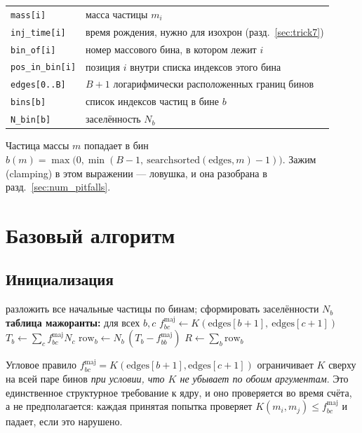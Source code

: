 \documentclass[a4paper,12pt]{article}
\newcommand{\fmaj}{f^{\mathrm{maj}}}
\newcommand{\code}[1]{\texttt{#1}}
\begin{document}
\begin{center}
\small
\begin{tabular}{@{}ll@{}}
\toprule
\code{mass[i]}       & масса частицы $m_i$ \\
\code{inj\_time[i]}  & время рождения, нужно для изохрон (разд.~\ref{sec:trick7}) \\
\code{bin\_of[i]}    & номер массового бина, в котором лежит $i$ \\
\code{pos\_in\_bin[i]} & позиция $i$ внутри списка индексов этого бина \\
\midrule
\code{edges[0..B]}   & $B+1$ логарифмически расположенных границ бинов \\
\code{bins[b]}       & список индексов частиц в бине $b$ \\
\code{N\_bin[b]}     & заселённость $N_b$ \\
\bottomrule
\end{tabular}
\end{center}

Частица массы $m$ попадает в бин
$b(m) = \max\bigl(0,\min(B-1,\ \mathrm{searchsorted}(\text{edges},m)-1)\bigr)$.
Зажим (clamping) в этом выражении --- ловушка, и она разобрана в
разд.~\ref{sec:num_pitfalls}.

\section{Базовый алгоритм}
\label{sec:num_algorithm}

\subsection{Инициализация}

\begin{algorithm}[h]
\caption{Инициализация: бины, таблица мажоранты, вектор скоростей}
\label{alg:setup}
\begin{algorithmic}[1]
\State разложить все начальные частицы по бинам; сформировать заселённости $N_b$
\State \textbf{таблица мажоранты:} для всех $b,c$ \quad
       $\fmaj_{bc} \gets K(\text{edges}[b+1],\ \text{edges}[c+1])$
\State $T_b \gets \sum_c \fmaj_{bc} N_c$
\State $\text{row}_b \gets N_b\,(T_b - \fmaj_{bb})$
\State $R \gets \sum_b \text{row}_b$
\end{algorithmic}
\end{algorithm}

Угловое правило $\fmaj_{bc}=K(\text{edges}[b+1],\text{edges}[c+1])$
ограничивает $K$ сверху на всей паре бинов \emph{при условии, что $K$ не
убывает по обоим аргументам}. Это единственное структурное требование к
ядру, и оно проверяется во время счёта, а не предполагается: каждая
принятая попытка проверяет $K(m_i,m_j) \le \fmaj_{bc}$ и падает, если это
нарушено.
\end{document}
